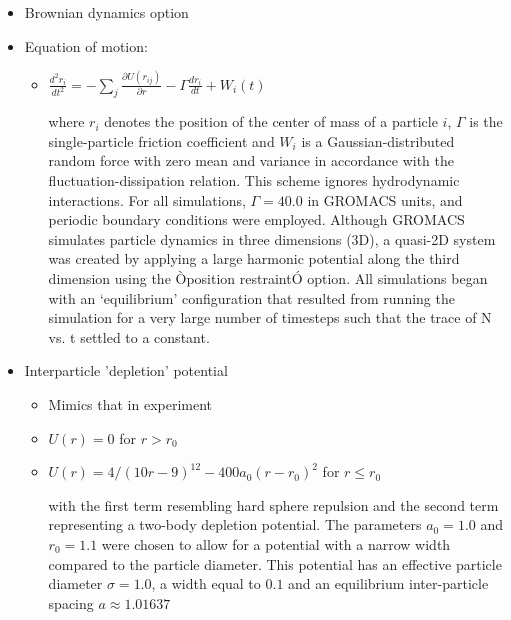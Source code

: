 \documentclass{umthesis}          %
\begin{document}
\begin{itemize}

\item Brownian dynamics option\\
\label{sec-2.3.3.1}


\item Equation of motion:\\
\label{sec-2.3.3.2}

\begin{itemize}

\item $\frac{d^2 r_i}{dt^2}  = - \sum_j \frac{\partial{U(r_{ij})}}{{\partial r}}  - \Gamma  \frac{d r_i}{dt} + W_i (t)$\\
\label{sec-2.3.3.2.1}

      where $r_i$ denotes the position of the center of mass of a particle $i$, $\Gamma$ is the single-particle friction coefficient and $W_i$ is a Gaussian-distributed random force with zero mean and variance in accordance with the fluctuation-dissipation relation.  This scheme ignores hydrodynamic interactions. For all simulations, $\Gamma=40.0$ in GROMACS units, and periodic boundary conditions were employed. Although GROMACS simulates particle dynamics in three dimensions (3D), a quasi-2D system was created by applying a large harmonic potential along the third dimension using the Òposition restraintÓ option. All simulations began with an `equilibrium' configuration that resulted from running the simulation for a very large number of timesteps such that the trace of N vs. t settled to a constant.
\end{itemize} %

\item Interparticle 'depletion' potential\\
\label{sec-2.3.3.3}

\begin{itemize}

\item Mimics that in experiment\\
\label{sec-2.3.3.3.1}


\item $U(r)=0$ for $r > r_0$\\
\label{sec-2.3.3.3.2}


\item $U(r)=4/(10r-9)^{12} -  400 a_0 (r-r_0)^2$ for $r \le r_0$\\
\label{sec-2.3.3.3.3}

with the first term resembling hard sphere repulsion and the second term  representing a two-body depletion potential. The parameters $a_0=1.0$ and $r_0=1.1$ were chosen to allow for  a potential with a narrow width compared to the particle diameter. This potential has an effective particle diameter $\sigma=1.0$,  a width equal to $0.1$ and an equilibrium inter-particle spacing $a \approx 1.01637$
\end{itemize} %


\end{itemize}
\end{document}
